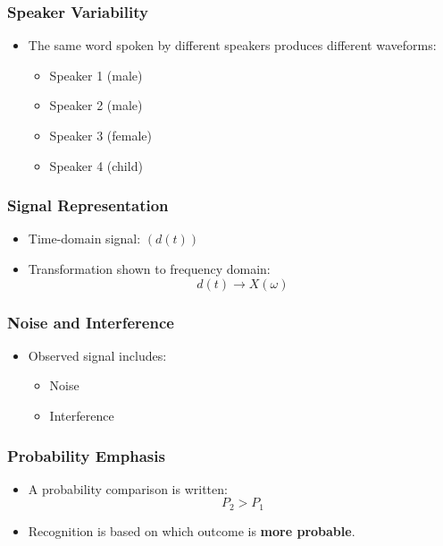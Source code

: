 \documentclass[12pt]{article}
\begin{document}
\subsubsection*{Speaker Variability}

\begin{itemize}
  \item The same word spoken by different speakers produces different waveforms:
  \begin{itemize}
    \item Speaker 1 (male)
    \item Speaker 2 (male)
    \item Speaker 3 (female)
    \item Speaker 4 (child)
  \end{itemize}
\end{itemize}

\subsubsection*{Signal Representation}

\begin{itemize}
  \item Time-domain signal: $( d(t) )$
  \item Transformation shown to frequency domain:
  \[
  d(t) \rightarrow X(\omega)
  \]
\end{itemize}

\subsubsection*{Noise and Interference}

\begin{itemize}
  \item Observed signal includes:
  \begin{itemize}
    \item Noise
    \item Interference
  \end{itemize}
\end{itemize}

\subsubsection*{Probability Emphasis}

\begin{itemize}
  \item A probability comparison is written:
  \[
  P_2 > P_1
  \]
  \item Recognition is based on which outcome is \textbf{more probable}.
\end{itemize}
\end{document}
